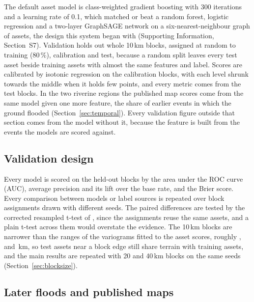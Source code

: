 \documentclass[10pt,a4paper,twocolumn]{article}
\begin{document}
The default asset model is class-weighted gradient boosting with 300 iterations and a learning rate of 0.1, which matched or beat a random forest, logistic regression and a two-layer GraphSAGE network \citep{hamilton2017} on a six-nearest-neighbour graph of assets, the design this system began with (Supporting Information, Section~S7). Validation holds out whole 10\,km blocks, assigned at random to training (80\,\%), calibration and test, because a random split leaves every test asset beside training assets with almost the same features and label. Scores are calibrated by isotonic regression on the calibration blocks, with each level shrunk towards the middle when it holds few points, and every metric comes from the test blocks. In the two riverine regions the published map scores come from the same model given one more feature, the share of earlier events in which the ground flooded (Section~\ref{sec:temporal}). Every validation figure outside that section comes from the model without it, because the feature is built from the events the models are scored against.

\subsection{Validation design}
\label{sec:design}

Every model is scored on the held-out blocks by the area under the ROC curve (AUC), average precision and its lift over the base rate, and the Brier score. Every comparison between models or label sources is repeated over \RRBenchSeeds{} block assignments drawn with different seeds. The paired differences are tested by the corrected resampled t-test of \citet{nadeau2003}, since the assignments reuse the same assets, and a plain t-test across them would overstate the evidence. The 10\,km blocks are narrower than the ranges of the variograms fitted to the asset scores, roughly \RRVariogramRangeKm{}, \SylhetVariogramRangeKm{} and \CoastalVariogramRangeKm{}\,km, so test assets near a block edge still share terrain with training assets, and the main results are repeated with 20 and 40\,km blocks on the same seeds (Section~\ref{sec:blocksize}).

\subsection{Later floods and published maps}
\label{sec:rolling}
\end{document}
